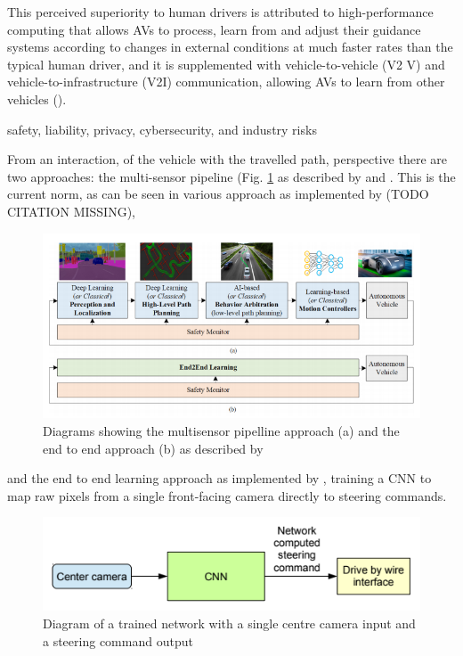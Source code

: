 This perceived superiority to human drivers is attributed to high-performance computing that allows AVs to process, learn from and adjust their guidance systems according
to changes in external conditions at much faster rates than the typical human driver, and it
is supplemented with vehicle-to-vehicle (V2 V) and vehicle-to-infrastructure (V2I) communication, allowing AVs to learn from other vehicles (\cite{west2016moving}).

safety, liability, privacy, cybersecurity, and industry risks \cite{Taeihagh_2018}

From an interaction, of the vehicle with the travelled path, perspective there are two approaches: the multi-sensor pipeline (Fig. \ref{fig:grigorescu-pipeline} as described by \cite{Grigorescu_2020} and \cite{Yurtsever_2020}. This is the current norm, as can be seen in various 
approach as implemented by (TODO CITATION MISSING), 

\begin{figure}[ht]
 \centering 
 \includegraphics[scale=0.85]{Figures/grigorescu-pipeline.png}
 \caption{Diagrams showing the multisensor pipelline approach (a) and the end to end approach (b) as described by \cite{Grigorescu_2020}}
 \label{fig:grigorescu-pipeline}
\end{figure}



and the end to end learning approach as implemented by \cite{bojarski2016end}, training a CNN to map raw pixels from a single front-facing camera directly to steering commands.
\begin{figure}[ht]
 \centering 
 \includegraphics[scale=1]{Figures/bojarski-nvidia.png}
 \caption{Diagram of a trained network with a single centre camera input and a steering command output}
 \label{fig:bojarski-net}
\end{figure}


